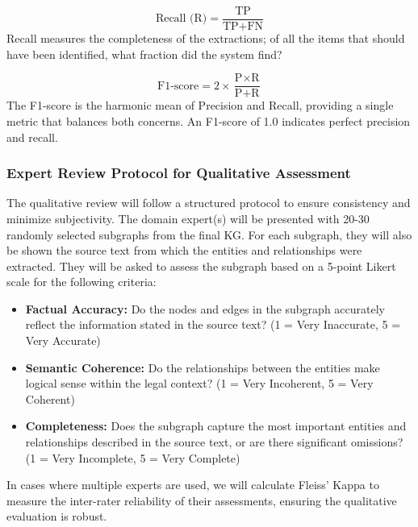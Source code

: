 \begin{equation}
    \text{Recall (R)} = \frac{\text{TP}}{\text{TP} + \text{FN}}
\end{equation}
Recall measures the completeness of the extractions; of all the items that should have been identified, what fraction did the system find?

\begin{equation}
    \text{F1-score} = 2 \times \frac{\text{P} \times \text{R}}{\text{P} + \text{R}}
\end{equation}
The F1-score is the harmonic mean of Precision and Recall, providing a single metric that balances both concerns. An F1-score of 1.0 indicates perfect precision and recall.

\subsubsection{Expert Review Protocol for Qualitative Assessment}
The qualitative review will follow a structured protocol to ensure consistency and minimize subjectivity. The domain expert(s) will be presented with 20-30 randomly selected subgraphs from the final KG. For each subgraph, they will also be shown the source text from which the entities and relationships were extracted. They will be asked to assess the subgraph based on a 5-point Likert scale for the following criteria:
\begin{itemize}
    \item \textbf{Factual Accuracy:} Do the nodes and edges in the subgraph accurately reflect the information stated in the source text? (1 = Very Inaccurate, 5 = Very Accurate)
    \item \textbf{Semantic Coherence:} Do the relationships between the entities make logical sense within the legal context? (1 = Very Incoherent, 5 = Very Coherent)
    \item \textbf{Completeness:} Does the subgraph capture the most important entities and relationships described in the source text, or are there significant omissions? (1 = Very Incomplete, 5 = Very Complete)
\end{itemize}
In cases where multiple experts are used, we will calculate Fleiss' Kappa to measure the inter-rater reliability of their assessments, ensuring the qualitative evaluation is robust.

